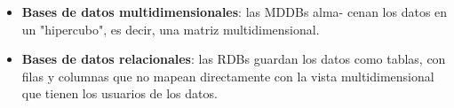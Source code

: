 \documentclass{fancyslides}
\begin{document}
\begin{frame}
\end{frame}

\begin{frame}
\misc
{
\begin{itemize}
  \item \textbf{Bases de datos multidimensionales}: las MDDBs alma- cenan los datos en un "hipercubo", es decir, una matriz multidimensional.

\item \textbf{Bases de datos relacionales}: las RDBs guardan los datos como tablas, con filas y columnas que no mapean directamente con la vista multidimensional que tienen los usuarios de los datos.
\end{itemize}
}
\end{frame}

\begin{frame}
\end{frame}

\begin{frame}
\end{frame}
\end{document}
